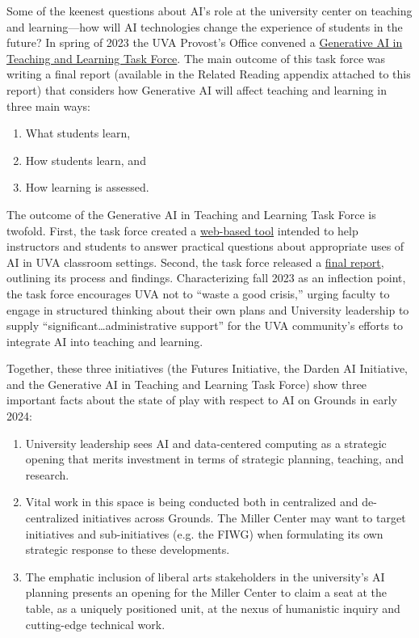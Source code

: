 \documentclass[12pt, oneside]{article}   	%
\begin{document}
Some of the keenest questions about AI’s role at the university center on teaching and learning—how will AI technologies change the experience of students in the future?  In spring of 2023 the UVA Provost’s Office convened a \href{https://provost.virginia.edu/subsite/genai}{Generative AI in Teaching and Learning Task Force}.  The main outcome of this task force was writing a final report (available in the Related Reading appendix attached to this report) that considers how Generative AI will affect teaching and learning in three main ways:
\begin{enumerate}
\item What students learn,
\item How students learn, and
\item How learning is assessed.
\end{enumerate}
The outcome of the Generative AI in Teaching and Learning Task Force is twofold.  First, the task force created a \href{https://provost.virginia.edu/subsite/genai/faqs}{web-based tool} intended to help instructors and students to answer practical questions about appropriate uses of AI in UVA classroom settings.  Second, the task force released a \href{https://provost.virginia.edu/subsite/genai/task-force-report}{final report}, outlining its process and findings.  Characterizing fall 2023 as an inflection point, the task force encourages UVA not to “waste a good crisis,” urging faculty to engage in structured thinking about their own plans and University leadership to supply “significant…administrative support” for the UVA community’s efforts to integrate AI into teaching and learning.

Together, these three initiatives (the Futures Initiative, the Darden AI Initiative, and the Generative AI in Teaching and Learning Task Force) show three important facts about the state of play with respect to AI on Grounds in early 2024:
\begin{enumerate}
\item University leadership sees AI and data-centered computing as a strategic opening that merits investment in terms of strategic planning, teaching, and research.
\item Vital work in this space is being conducted both in centralized and de-centralized initiatives across Grounds.  The Miller Center may want to target initiatives and sub-initiatives (e.g. the FIWG) when formulating its own strategic response to these developments.
\item The emphatic inclusion of liberal arts stakeholders in the university’s AI planning presents an opening for the Miller Center to claim a seat at the table, as a uniquely positioned unit, at the nexus of humanistic inquiry and cutting-edge technical work.
\end{enumerate}
\end{document}
